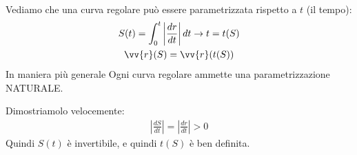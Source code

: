 \documentclass[a4paper, oneside]{article}
\begin{document}
\hfill\\
\begin{proposition}
    Vediamo che una curva regolare può essere parametrizzata rispetto a $t$ (il tempo):
    \begin{gather*}
        S(t) = \int_{0}^{t} \left\lvert \frac{dr}{dt} \right\rvert dt \to t = t(S)\\
        \vv{r}(S) = \vv{r}(t(S)) 
    \end{gather*}
    In maniera più generale Ogni curva regolare ammette una parametrizzazione NATURALE.
    \begin{center}
    \end{center}
    Dimostriamolo velocemente:
    \begin{gather*}
        \left\lvert \frac{dS}{dt} \right\rvert = \left\lvert \frac{dr}{dt} \right\rvert > 0  
    \end{gather*}
    Quindi $S(t)$ è invertibile, e quindi $t(S)$ è ben definita.\\
\end{proposition}
\end{document}
